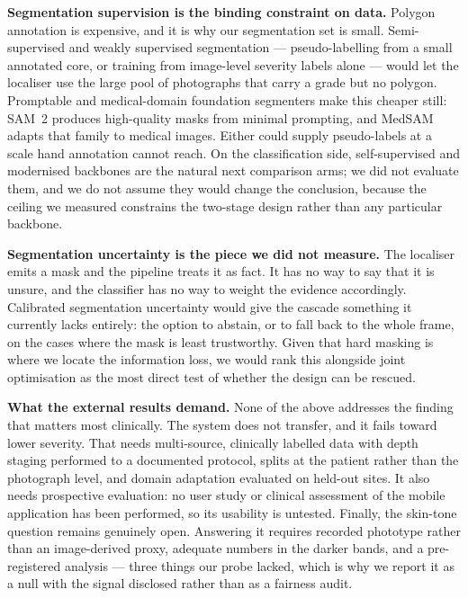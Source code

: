 \documentclass{melba}
\begin{document}
\textbf{Segmentation supervision is the binding constraint on data.} Polygon annotation is expensive, and it is why our segmentation set is small. Semi-supervised and weakly supervised segmentation --- pseudo-labelling from a small annotated core, or training from image-level severity labels alone --- would let the localiser use the large pool of photographs that carry a grade but no polygon. Promptable and medical-domain foundation segmenters make this cheaper still: SAM~2 \citep{sam2} produces high-quality masks from minimal prompting, and MedSAM \citep{medsam} adapts that family to medical images. Either could supply pseudo-labels at a scale hand annotation cannot reach. On the classification side, self-supervised and modernised backbones \citep{dinov2,convnextv2} are the natural next comparison arms; we did not evaluate them, and we do not assume they would change the conclusion, because the ceiling we measured constrains the two-stage design rather than any particular backbone.

\textbf{Segmentation uncertainty is the piece we did not measure.} The localiser emits a mask and the pipeline treats it as fact. It has no way to say that it is unsure, and the classifier has no way to weight the evidence accordingly. Calibrated segmentation uncertainty would give the cascade something it currently lacks entirely: the option to abstain, or to fall back to the whole frame, on the cases where the mask is least trustworthy. Given that hard masking is where we locate the information loss, we would rank this alongside joint optimisation as the most direct test of whether the design can be rescued.

\textbf{What the external results demand.} None of the above addresses the finding that matters most clinically. The system does not transfer, and it fails toward lower severity. That needs multi-source, clinically labelled data with depth staging performed to a documented protocol, splits at the patient rather than the photograph level, and domain adaptation evaluated on held-out sites. It also needs prospective evaluation: no user study or clinical assessment of the mobile application has been performed, so its usability is untested. Finally, the skin-tone question remains genuinely open. Answering it requires recorded phototype rather than an image-derived proxy, adequate numbers in the darker bands, and a pre-registered analysis --- three things our probe lacked, which is why we report it as a null with the signal disclosed rather than as a fairness audit.
\end{document}
